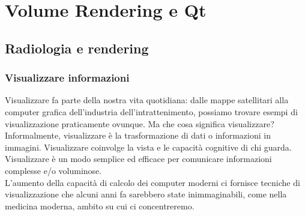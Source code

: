 
\chapter{Volume Rendering e Qt}
\label{cap:teoria-stage}

\section{Radiologia e rendering}
\subsection{Visualizzare informazioni}\label{sec:visualizzare-informazioni}
Visualizzare fa parte della nostra vita quotidiana: dalle mappe satellitari alla computer grafica dell'industria dell'intrattenimento, possiamo trovare esempi di visualizzazione praticamente ovunque. Ma che cosa significa visualizzare? Informalmente, visualizzare è la trasformazione di dati o informazioni in immagini. Visualizzare coinvolge la vista e le capacità cognitive di chi guarda. Visualizzare è un modo semplice ed efficace per comunicare informazioni complesse e/o voluminose.
\\
L'aumento della capacità di calcolo dei computer moderni ci fornisce tecniche di visualizzazione che alcuni anni fa sarebbero state inimmaginabili, come nella medicina moderna, ambito su cui ci concentreremo.

